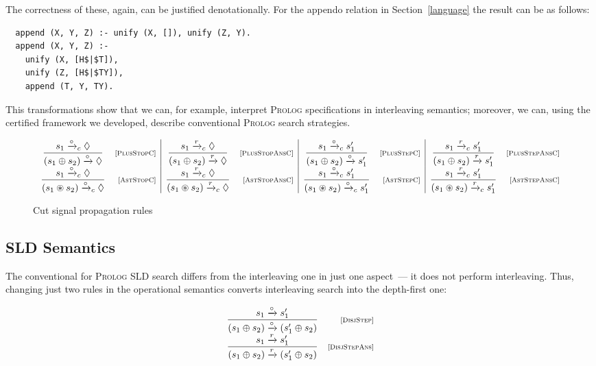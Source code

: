 The correctness of these, again, can be justified denotationally. For the appendo relation in Section~\ref{language} the result
can be as follows:

\begin{lstlisting}
  append (X, Y, Z) :- unify (X, []), unify (Z, Y).
  append (X, Y, Z) :-
    unify (X, [H$|$T]),
    unify (Z, [H$|$TY]),
    append (T, Y, TY).
\end{lstlisting}

This transformations show that we can, for example, interpret \textsc{Prolog} specifications in interleaving semantics; moreover, we can,
using the certified framework we developed, describe conventional \textsc{Prolog} search strategies.

\begin{figure*}
\[
\begin{array}{cr|cr|cr|cr}
  \dfrac{s_1 \xrightarrow{\circ}_c \Diamond}{(s_1 \oplus s_2) \xrightarrow{\circ} \Diamond} & \mbox{\scriptsize{[\textsc{PlusStopC}]}}&
  \dfrac{s_1 \xrightarrow{r}_c \Diamond}{(s_1 \oplus s_2) \xrightarrow{r} \Diamond} & \mbox{\scriptsize{[\textsc{PlusStopAnsC}]}}&
  \dfrac{s_1 \xrightarrow{\circ}_c s'_1}{(s_1 \oplus s_2) \xrightarrow{\circ} s'_1} &\mbox{\scriptsize{[\textsc{PlusStepC}]}}&
  \dfrac{s_1 \xrightarrow{r}_c s'_1}{(s_1 \oplus s_2) \xrightarrow{r} s'_1} &\mbox{\scriptsize{[\textsc{PlusStepAnsC}]}}\\
  \dfrac{s_1 \xrightarrow{\circ}_c \Diamond}{(s_1 \circledast s_2) \xrightarrow{\circ}_c \Diamond} & \mbox{\scriptsize{[\textsc{AstStopC}]}}&
  \dfrac{s_1 \xrightarrow{r}_c \Diamond}{(s_1 \circledast s_2) \xrightarrow{r}_c \Diamond} & \mbox{\scriptsize{[\textsc{AstStopAnsC}]}}&
  \dfrac{s_1 \xrightarrow{\circ}_c s'_1}{(s_1 \circledast s_2) \xrightarrow{\circ}_c s'_1} &\mbox{\scriptsize{[\textsc{AstStepC}]}}&
  \dfrac{s_1 \xrightarrow{r}_c s'_1}{(s_1 \circledast s_2) \xrightarrow{r}_c s'_1} &\mbox{\scriptsize{[\textsc{AstStepAnsC}]}}
\end{array}
\]
\caption{Cut signal propagation rules}
\label{cut-signal-propagation}
\end{figure*}

\subsection{SLD Semantics}

The conventional for \textsc{Prolog} SLD search differs from the interleaving one in just one aspect~--- it does not perform interleaving.
Thus, changing just two rules in the operational semantics converts interleaving search into the depth-first one:

\[
  \begin{array}{cr}
    \dfrac{s_1 \xrightarrow{\circ} s'_1}{(s_1 \oplus s_2) \xrightarrow{\circ} (s'_1 \oplus s_2)} &\mbox{\scriptsize{[\textsc{DisjStep}]}}\\
    \dfrac{s_1 \xrightarrow{r} s'_1}{(s_1 \oplus s_2) \xrightarrow{r} (s'_1 \oplus s_2)} &\mbox{\scriptsize{[\textsc{DisjStepAns}]}}
  \end{array}
\]

